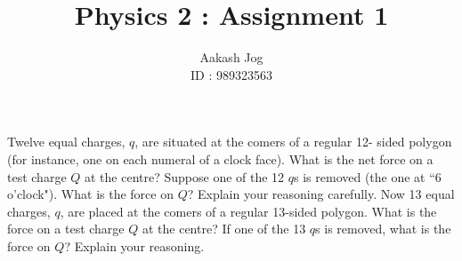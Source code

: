 \documentclass[fleqn, a4paper, 12pt, oneside]{amsart}
\title{Physics 2 : Assignment 1}
\author
{
	Aakash Jog\\
	ID : 989323563
}
\date{\formatdate{18}{3}{2015}}
\theoremstyle{definition}
\theoremstyle{theorem}
\begin{document}
	
\maketitle

\begin{question}
	\begin{tasks}
		\task
			Twelve equal charges, $q$, are situated at the comers of a regular 12- sided polygon (for instance, one on each numeral of a clock face). What is the net force on a test charge $Q$ at the centre?
		\task
			Suppose one of the 12 $q$s is removed (the one at ``6 o'clock"). What is the force on $Q$? Explain your reasoning carefully.
		\task
			Now 13 equal charges, $q$, are placed at the comers of a regular 13-sided polygon. What is the force on a test charge $Q$ at the centre?
		\task
			If one of the 13 $q$s is removed, what is the force on $Q$? Explain your reasoning.
	\end{tasks}
\end{question}
\end{document}
